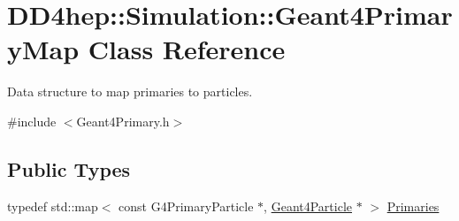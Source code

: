 \hypertarget{class_d_d4hep_1_1_simulation_1_1_geant4_primary_map}{}\section{D\+D4hep\+:\+:Simulation\+:\+:Geant4\+Primary\+Map Class Reference}
\label{class_d_d4hep_1_1_simulation_1_1_geant4_primary_map}


Data structure to map primaries to particles.  




{\ttfamily \#include $<$Geant4\+Primary.\+h$>$}

\subsection*{Public Types}
\begin{DoxyCompactItemize}
\item 
typedef std\+::map$<$ const G4\+Primary\+Particle $\ast$, \hyperlink{class_d_d4hep_1_1_simulation_1_1_geant4_particle}{Geant4\+Particle} $\ast$ $>$ \hyperlink{class_d_d4hep_1_1_simulation_1_1_geant4_primary_map_aec80e9bb254e582ef410dc65da5809c3}{Primaries}
\end{DoxyCompactItemize}
